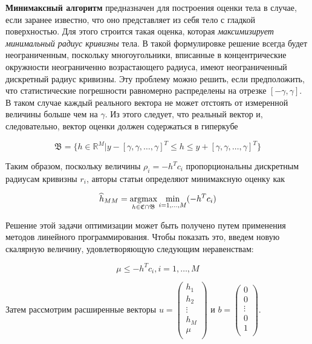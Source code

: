 \documentclass[a4paper, 12pt, titlepage]{article}
\theoremstyle{definition}
\theoremstyle{plain}
\theoremstyle{plain}
\begin{document}
\textbf{Минимаксный алгоритм} предназначен для построения
оценки тела в случае, если заранее известно, что оно представляет из себя тело
с гладкой поверхностью. Для этого строится такая оценка, которая
\textit{максимизирует минимальный радиус кривизны} тела. В такой формулировке
решение всегда будет неограниченным, поскольку многоугольники, вписанные в
концентрические окружности неограниченно возрастающего радиуса, имеют
неограниченный дискретный радиус кривизны. Эту проблему можно решить, если
предположить, что статистические погрешности равномерно распределены на отрезке
$[ - \gamma, \gamma]$. В таком случае каждый реального вектора не может
отстоять от измеренной величины больше чем на $\gamma$. Из этого следует, что
реальный вектор и, следовательно, вектор оценки должен содержаться в гиперкубе

\begin{equation}
\mathfrak{B} = \{h \in \mathbb{R}^{M} |
y - [\gamma, \gamma, \ldots, \gamma]^{T} \leq h \leq
y + [\gamma, \gamma, \ldots, \gamma]^{T}\}
\end{equation}

Таким образом, поскольку величины $\rho_{i} = - h^{T} c_{i}$ пропорциональны
дискретным радиусам кривизны $r_{i}$, авторы статьи определяют минимаксную
оценку как

\begin{equation}
\widehat{h}_{MM} =
\operatornamewithlimits{argmax}_{h \in \mathfrak{C} \cap \mathfrak{B}}
\min_{i = 1, \ldots, M} ( - h^{T} c_{i})
\end{equation}

Решение этой задачи оптимизации может быть получено путем применения методов
линейного программирования. Чтобы показать это, введем новую скалярную величину,
удовлетворяющую следующим неравенствам:

\begin{equation}
\mu \leq - h^{T} c_{i}, i = 1, \ldots, M
\end{equation}

Затем рассмотрим расширенные векторы
$u = \left(
\begin{array}{c}
 h_{1} \\
 h_{2} \\
 \vdots \\
 h_{M} \\
 \mu \\
\end{array}
\right)$ и
$ b = \left(\begin{array}{c}
 0 \\
 0 \\
 \vdots \\
 0 \\
 1 \\
\end{array}
\right)$.
\end{document}
